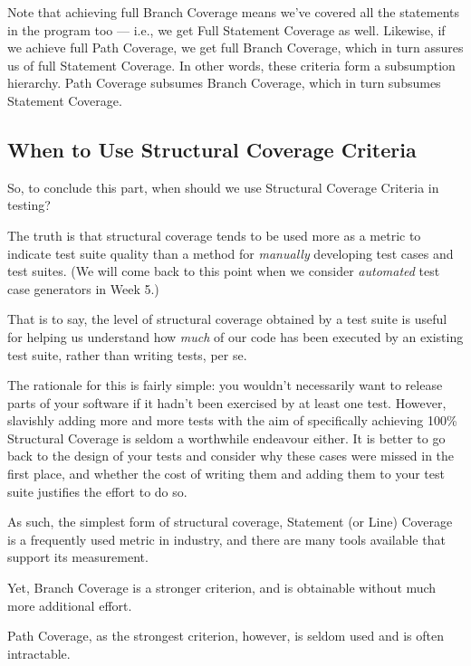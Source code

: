 
Note that achieving full Branch Coverage means we've covered all the statements
in the program too --- i.e., we get Full Statement Coverage as well. Likewise,
if we achieve full Path Coverage, we get full Branch Coverage, which in turn
assures us of full Statement Coverage. In other words, these criteria form a
subsumption hierarchy. Path Coverage subsumes Branch Coverage, which in turn
subsumes Statement Coverage.


\subsection{When to Use Structural Coverage Criteria} 

So, to conclude this part, when should we use Structural Coverage Criteria in
testing?


The truth is that structural coverage tends to be used more as a metric to
indicate test suite quality than a method for {\it manually} developing test
cases and test suites. (We will come back to this point when we consider {\it
automated} test case generators in Week 5.)

That is to say, the level of structural coverage obtained by a test suite is
useful for helping us understand how {\it much} of our code has been executed by
an existing test suite, rather than writing tests, per se.


The rationale for this is fairly simple: you wouldn't necessarily want to
release parts of your software if it hadn't been exercised by at least one test.
However, slavishly adding more and more tests with the aim of specifically
achieving 100\% Structural Coverage is seldom a worthwhile endeavour either. It
is better to go back to the design of your tests and consider why these cases
were missed in the first place, and whether the cost of writing them and adding
them to your test suite justifies the effort to do so.


As such, the simplest form of structural coverage, Statement (or Line) Coverage
is a frequently used metric in industry, and there are many tools available that
support its measurement. 


Yet, Branch Coverage is a stronger criterion, and is obtainable without much
more additional effort. 


Path Coverage, as the strongest criterion, however, is seldom used and is often
intractable.


